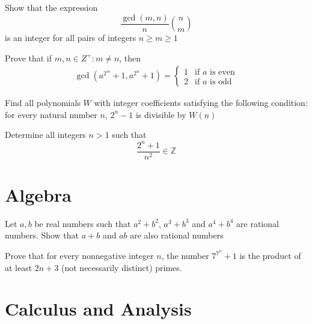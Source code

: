 \begin{problem}[N][5][Putnam 2000]
    Show that the expression 
    $$ \frac{\gcd(m,n)}{n} \binom{n}{m} $$
    is an integer for all pairs of integers $n \geq m \geq 1$
\end{problem}

\begin{problem}
    Prove that if $m,n \in Z^+: m \neq n$, then
    \begin{align*}
        \gcd \left(a^{2^m}+1, a^{2^n}+1\right) = 
        \begin{cases}
            1 & \text{if } a \text{ is even} \\
            2 & \text{if } a \text{ is odd}
        \end{cases}
    \end{align*}
\end{problem}

\begin{problem}[N][6][Polish 2003]
    Find all polynomials $W$ with integer coefficients satisfying the following condition: for every natural number $n$, $2^n-1$ is divisible by $W(n)$
\end{problem}

\begin{problem}[N][8][IMO 1990]
    Determine all integers $n>1$ such that
    $$\frac{2^n+1}{n^2} \in \mathbb{Z}$$
\end{problem}

\newpage

\section{Algebra}

\begin{problem}[A][4]
    Let $a,b$ be real numbers such that  $a^2+b^2$, $a^3+b^3$ and $a^4+b^4$ are rational numbers. Show that $a+b$ and $ab$ are also rational numbers
\end{problem}

\begin{problem}[A][9][USAMO 2007]
    Prove that for every nonnegative integer $n$, the number $7^{7^n}+1$ is the product of at least $2n + 3$ (not necessarily distinct) primes.
\end{problem}



\newpage

\section{Calculus and Analysis}









